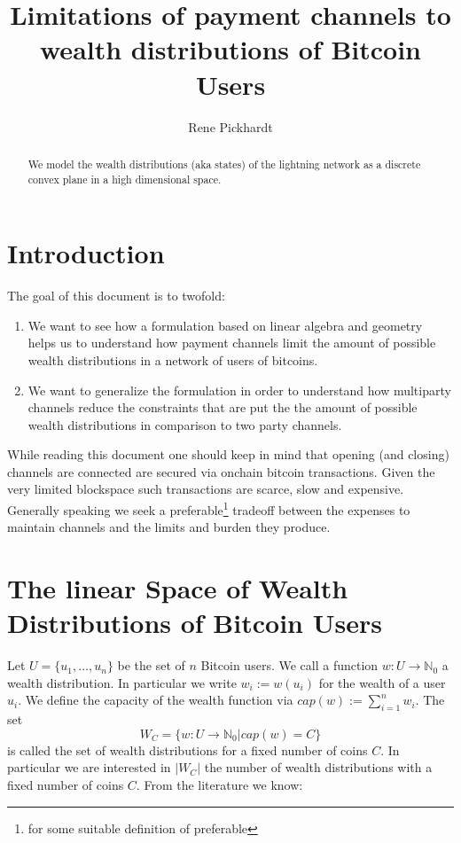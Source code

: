 \documentclass[10pt,twocolumn]{article}
\title{Limitations of payment channels to wealth distributions of Bitcoin Users}
\author{Rene Pickhardt}
\begin{document}
 
\maketitle






 
\begin{abstract}
We model the wealth distributions (aka states) of the lightning network as a discrete convex plane in a high dimensional space.
  
\end{abstract}

\section{Introduction}
The goal of this document is to twofold:
\begin{enumerate}
\item We want to see how a formulation based on linear algebra and geometry helps us to understand how payment channels limit the amount of possible wealth distributions in a network of users of bitcoins.
\item We want to generalize the formulation in order to understand how multiparty channels reduce the constraints that are put the the amount of possible wealth distributions in comparison to two party channels.
\end{enumerate}
While reading this document one should keep in mind that opening (and closing) channels are connected are secured via onchain bitcoin transactions.
Given the very limited blockspace such transactions are scarce, slow and expensive.
Generally speaking we seek a preferable\footnote{for some suitable definition of preferable} tradeoff between the expenses to maintain channels and the limits and burden they produce.
\section{The linear Space of Wealth Distributions of Bitcoin Users}
Let $U = \{u_1,\dots,u_n\}$ be the set of $n$ Bitcoin users.
We call a function $w:U\longrightarrow\mathbb{N}_0$ a wealth distribution.
In particular we write $w_i := w(u_i)$ for the wealth of a user $u_i$.
We define the capacity of the wealth function via $cap(w):= \sum_{i=1}^nw_i$.
The set
$$W_C = \{w:U\longrightarrow \mathbb{N}_0 | cap(w)=C\}$$
is called the set of wealth distributions for a fixed number of coins $C$. 
In particular we are interested in $|W_C|$ the number of wealth distributions with a fixed number of coins $C$.
From the literature we know:
\end{document}
